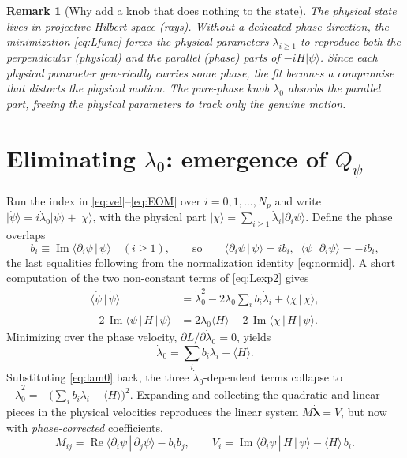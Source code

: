 \documentclass[12pt,a4paper]{article}
\newcommand{\ket}[1]{\lvert #1 \rangle}
\newcommand{\braket}[2]{\langle #1 \,|\, #2 \rangle}
\newcommand{\mel}[3]{\langle #1 \,|\, #2 \,|\, #3 \rangle}
\newcommand{\re}{\operatorname{Re}}
\newcommand{\im}{\operatorname{Im}}
\newcommand{\dlam}{\dot{\boldsymbol{\lambda}}}
\newtheorem{remark}{Remark}[section]
\begin{document}
\begin{remark}[Why add a knob that does nothing to the state]
The physical state lives in projective Hilbert space (rays). Without a dedicated phase direction,
the minimization \eqref{eq:Lfunc} forces the physical parameters $\lambda_{i\ge1}$ to reproduce
\emph{both} the perpendicular (physical) and the parallel (phase) parts of $-iH\ket{\psi}$. Since each
physical parameter generically carries some phase, the fit becomes a compromise that distorts the
physical motion. The pure-phase knob $\lambda_0$ absorbs the parallel part, freeing the physical
parameters to track only the genuine motion.
\end{remark}

\section{Eliminating $\lambda_0$: emergence of $Q_\psi$}\label{sec:project}

Run the index in \eqref{eq:vel}--\eqref{eq:EOM} over $i=0,1,\dots,N_p$ and write
$\ket{\dot\psi}=i\dot\lambda_0\ket{\psi}+\ket{\chi}$, with the physical part
$\ket{\chi}=\sum_{i\ge1}\dot\lambda_i\ket{\partial_i\psi}$. Define the phase overlaps
\begin{equation}
  b_i\equiv\im\braket{\partial_i\psi}{\psi}\quad(i\ge1),
  \qquad\text{so}\qquad
  \braket{\partial_i\psi}{\psi}=ib_i,\;\;\braket{\psi}{\partial_i\psi}=-ib_i,
  \label{eq:bdef}
\end{equation}
the last equalities following from the normalization identity \eqref{eq:normid}. A short computation
of the two non-constant terms of \eqref{eq:Lexp2} gives
\begin{align}
  \braket{\dot\psi}{\dot\psi}
    &=\dot\lambda_0^2-2\dot\lambda_0\!\sum_i b_i\dot\lambda_i+\braket{\chi}{\chi},\\
  -2\,\im\mel{\dot\psi}{H}{\psi}
    &=2\dot\lambda_0\langle H\rangle-2\,\im\mel{\chi}{H}{\psi}.
\end{align}
Minimizing over the phase velocity, $\partial L/\partial\dot\lambda_0=0$, yields
\begin{equation}
  \dot\lambda_0=\sum_i b_i\dot\lambda_i-\langle H\rangle.
  \label{eq:lam0}
\end{equation}
Substituting \eqref{eq:lam0} back, the three $\dot\lambda_0$-dependent terms collapse to
$-\dot\lambda_0^2=-\big(\sum_i b_i\dot\lambda_i-\langle H\rangle\big)^2$. Expanding and collecting the
quadratic and linear pieces in the physical velocities reproduces the linear system $M\dlam=V$, but
now with \emph{phase-corrected} coefficients,
\begin{equation}
  \boxed{\;M_{ij}=\re\braket{\partial_i\psi}{\partial_j\psi}-b_ib_j,
  \qquad
  V_i=\im\mel{\partial_i\psi}{H}{\psi}-\langle H\rangle\,b_i.\;}
  \label{eq:MVproj}
\end{equation}
\end{document}
